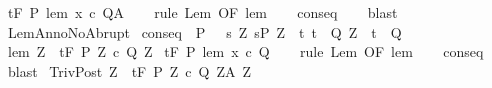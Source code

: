 \begin{isabellebody}
\ {\isachardoublequoteopen}{\isasymGamma}{\isacharcomma}{\isasymTheta}{\isasymturnstile}\isactrlsub t\isactrlbsub {\isacharslash}F\isactrlesub \ P\ {\isacharparenleft}lem\ x\ c{\isacharparenright}\ Q{\isacharcomma}A{\isachardoublequoteclose}\isanewline
%
\isadelimproof
\ \ %
\endisadelimproof
%
\isatagproof
{}\isamarkupfalse%
\ {\isacharparenleft}rule\ Lem\ {\isacharbrackleft}OF\ lem{\isacharbrackright}{\isacharparenright}\isanewline
\ \ \isamarkupfalse%
\ conseq\isanewline
\ \ \isamarkupfalse%
\ blast%
\endisatagproof
{\isafoldproof}%
%
\isadelimproof
\isanewline
%
\endisadelimproof
\isanewline
{}\isamarkupfalse%
\ LemAnnoNoAbrupt{\isacharcolon}\isanewline
{}\ conseq{\isacharcolon}\ \ {\isachardoublequoteopen}P\ {\isasymsubseteq}\ \ {\isacharbraceleft}s{\isachardot}\ {\isasymexists}Z{\isachardot}\ s{\isasymin}P{\isacharprime}\ Z\ {\isasymand}\ {\isacharparenleft}{\isasymforall}t{\isachardot}\ t\ {\isasymin}\ Q{\isacharprime}\ Z\ {\isasymlongrightarrow}\ t\ {\isasymin}\ Q{\isacharparenright}{\isacharbraceright}{\isachardoublequoteclose}\isanewline
{}\ lem{\isacharcolon}\ {\isachardoublequoteopen}{\isasymforall}Z{\isachardot}\ {\isasymGamma}{\isacharcomma}{\isasymTheta}\ {\isasymturnstile}\isactrlsub t\isactrlbsub {\isacharslash}F\isactrlesub \ {\isacharparenleft}P{\isacharprime}\ Z{\isacharparenright}\ c\ {\isacharparenleft}Q{\isacharprime}\ Z{\isacharparenright}{\isacharcomma}{\isacharbraceleft}{\isacharbraceright}{\isachardoublequoteclose}\isanewline
{}\ {\isachardoublequoteopen}{\isasymGamma}{\isacharcomma}{\isasymTheta}{\isasymturnstile}\isactrlsub t\isactrlbsub {\isacharslash}F\isactrlesub \ P\ {\isacharparenleft}lem\ x\ c{\isacharparenright}\ Q{\isacharcomma}{\isacharbraceleft}{\isacharbraceright}{\isachardoublequoteclose}\isanewline
%
\isadelimproof
\ \ %
\endisadelimproof
%
\isatagproof
{}\isamarkupfalse%
\ {\isacharparenleft}rule\ Lem\ {\isacharbrackleft}OF\ lem{\isacharbrackright}{\isacharparenright}\isanewline
\ \ \isamarkupfalse%
\ conseq\isanewline
\ \ \isamarkupfalse%
\ blast%
\endisatagproof
{\isafoldproof}%
%
\isadelimproof
\isanewline
%
\endisadelimproof
\isanewline
{}\isamarkupfalse%
\ TrivPost{\isacharcolon}\ {\isachardoublequoteopen}{\isasymforall}Z{\isachardot}\ {\isasymGamma}{\isacharcomma}{\isasymTheta}\ {\isasymturnstile}\isactrlsub t\isactrlbsub {\isacharslash}F\isactrlesub \ {\isacharparenleft}P{\isacharprime}\ Z{\isacharparenright}\ c\ {\isacharparenleft}Q{\isacharprime}\ Z{\isacharparenright}{\isacharcomma}{\isacharparenleft}A{\isacharprime}\ Z{\isacharparenright}\isanewline

\end{isabellebody}
